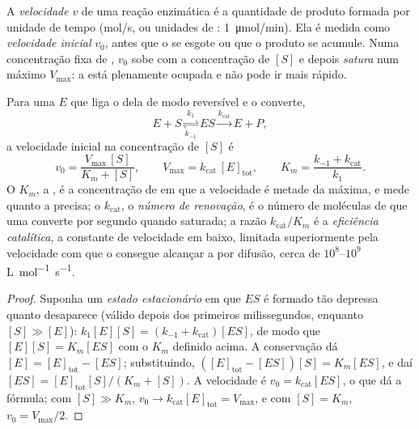 \begin{definition}\label{def:b1:enzymes:rate}
A \emph{velocidade} $v$ de uma reação
enzimática é a quantidade de produto formada por unidade de tempo
(\unit{mol/s}, ou unidades de : \qty{1}{\micro mol/min}). Ela é
medida como \emph{velocidade inicial} $v_0$, antes que o  se
esgote ou que o produto se acumule. Numa concentração fixa de ,
$v_0$ sobe com a concentração de  $[S]$ e depois \emph{satura}
num máximo $V_{\max}$: a  está plenamente ocupada e não pode ir
mais rápido.
\end{definition}

\begin{theorem}\label{thm:b1:enzymes:mm}
Para uma  $E$ que liga o  dela de modo reversível e o converte,
\[
E + S \underset{k_{-1}}{\overset{k_1}{\rightleftharpoons}} ES
\overset{k_{\text{cat}}}{\longrightarrow} E + P ,
\]
a velocidade inicial na concentração de  $[S]$ é
\[
v_0 = \frac{V_{\max}\,[S]}{K_m + [S]}, \qquad V_{\max} = k_{\text{cat}}\,[E]_{\text{tot}},
\qquad K_m = \frac{k_{-1} + k_{\text{cat}}}{k_1} .
\]
O $K_m$, a \emph{}, é a concentração de 
em que a velocidade é metade da máxima, e mede quanto  a 
precisa; o $k_{\text{cat}}$, o \emph{número de
renovação}, é o número de moléculas de
 que uma  converte por segundo quando saturada; a razão
$k_{\text{cat}}/K_m$ é a \emph{eficiência catalítica}, a constante de
velocidade em  baixo, limitada superiormente pela velocidade
com que o  consegue alcançar a  por difusão, cerca de
$10^8$--$10^9$ \unit{L.mol^{-1}.s^{-1}}.
\end{theorem}
\begin{proof}
Suponha um \emph{estado estacionário} em que $ES$ é formado tão depressa
quanto desaparece (válido depois dos primeiros milissegundos, enquanto
$[S] \gg [E]$): $k_1[E][S] = (k_{-1} + k_{\text{cat}})[ES]$, de modo que
$[E][S] = K_m[ES]$ com o $K_m$ definido acima. A conservação dá
$[E] = [E]_{\text{tot}} -
[ES]$; substituindo, $([E]_{\text{tot}} - [ES])[S] = K_m[ES]$, e daí
$[ES] = [E]_{\text{tot}}[S]/(K_m + [S])$. A velocidade é
$v_0 = k_{\text{cat}}[ES]$, o que dá a fórmula; com $[S] \gg K_m$,
$v_0 \to k_{\text{cat}}[E]_{\text{tot}} = V_{\max}$, e com $[S] = K_m$,
$v_0 = V_{\max}/2$.
\end{proof}

